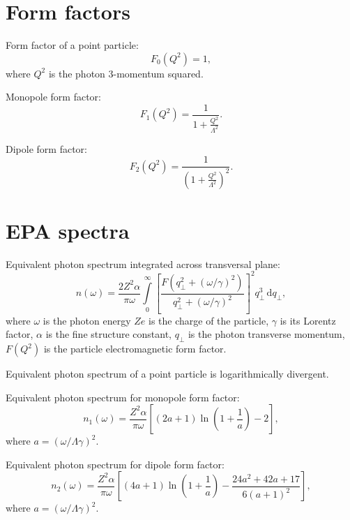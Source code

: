 \documentclass[a4paper,12pt]{article}
\begin{document}
\section{Form factors}

Form factor of a point particle:
\begin{equation}
  F_0(Q^2) = 1,
\end{equation}
where $Q^2$ is the photon 3-momentum squared.

Monopole form factor:
\begin{equation}
  F_1(Q^2) = \frac{1}{1 + \frac{Q^2}{\Lambda^2}}.
\end{equation}

Dipole form factor:
\begin{equation}
  F_2(Q^2) = \frac{1}{\left( 1 + \frac{Q^2}{\Lambda^2} \right)^2}.
\end{equation}

\section{EPA spectra}

Equivalent photon spectrum integrated across transversal plane:
\begin{equation}
  n(\omega)
  = \frac{2 Z^2 \alpha}{\pi \omega}
    \int\limits_0^\infty
      \left[
        \frac{F(q_\perp^2 + (\omega / \gamma)^2)}
             {q_\perp^2 + (\omega / \gamma)^2}
      \right]^2
      q_\perp^3
      \, \mathrm{d} q_\perp,
\end{equation}
where $\omega$ is the photon energy $Z e$ is the charge of the particle,
$\gamma$ is its Lorentz factor, $\alpha$ is the fine structure constant,
$q_\perp$ is the photon transverse momentum, $F(Q^2)$ is the particle
electromagnetic form factor.

Equivalent photon spectrum of a point particle is logarithmically divergent.

Equivalent photon spectrum for monopole form factor:
\begin{equation}
  n_1(\omega)
  = \frac{Z^2 \alpha}{\pi \omega}
    \left[ (2 a + 1) \ln \left(1 + \frac{1}{a} \right) - 2 \right],
\end{equation}
where $a = (\omega / \Lambda \gamma)^2$.

Equivalent photon spectrum for dipole form factor:
\begin{equation}
  n_2(\omega)
  = \frac{Z^2 \alpha}{\pi \omega}
    \left[
      (4 a + 1) \ln \left(1 + \frac{1}{a} \right)
      - \frac{24 a^2 + 42 a + 17}{6 (a + 1)^2}
    \right],
\end{equation}
where $a = (\omega / \Lambda \gamma)^2$.
\end{document}

